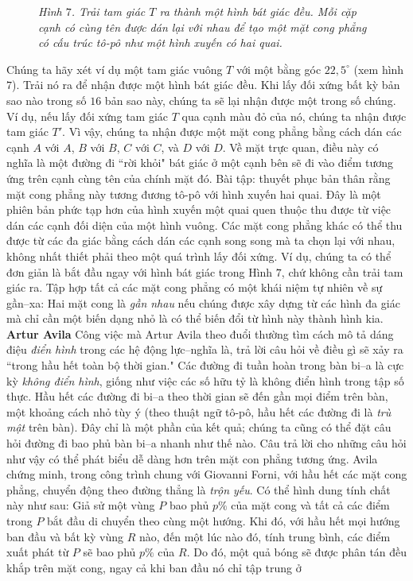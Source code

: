 \begin{multicols}{2}
\begin{figure}[H]
		\caption{\small\textit{\color{duongvaotoanhoc}Hình $7$. Trải tam giác $T$ ra thành một hình bát giác đều. Mỗi cặp cạnh có cùng tên được dán lại với nhau để tạo  một mặt cong phẳng có cấu trúc tô-pô như một hình xuyến có hai quai.}}
		\vspace*{-10pt}
	\end{figure}
	Chúng ta hãy xét ví dụ một tam giác vuông $T$ với một bằng góc $22,5^{\circ}$ (xem hình $7$). Trải nó ra để nhận được một hình bát giác đều. Khi lấy đối xứng bất kỳ bản sao nào trong số $16$ bản sao này, chúng ta sẽ lại nhận được một trong số chúng. Ví dụ, nếu lấy đối xứng tam giác $T$ qua cạnh màu đỏ của nó, chúng ta nhận được tam giác $T'.$ Vì vậy, chúng ta nhận được một mặt cong phẳng bằng cách dán các cạnh $A$ với $A$, $B$ với $B$, $C$ với $C$, và $D$ với $D.$
	\vskip 0.1cm
	Về mặt trực quan, điều này có nghĩa là một đường đi ``rời khỏi" bát giác ở một cạnh bên sẽ đi vào điểm tương ứng trên cạnh cùng tên của chính mặt đó. Bài tập: thuyết phục bản thân rằng mặt cong phẳng này tương đương tô-pô với hình xuyến hai quai. Đây là một phiên bản phức tạp hơn của hình xuyến một quai quen thuộc thu được từ việc dán các cạnh đối diện của một hình vuông.
	\vskip 0.1cm
	Các mặt cong phẳng khác có thể thu được từ các đa giác bằng cách dán các cạnh song song mà ta chọn lại với nhau, không nhất thiết phải theo một quá trình lấy đối xứng. Ví dụ, chúng ta có thể đơn giản là bắt đầu ngay với hình bát giác trong Hình $7$, chứ không cần trải tam giác ra. Tập hợp tất cả các mặt cong phẳng có một khái niệm tự nhiên về sự gần--xa: Hai mặt cong là \emph{gần nhau} nếu chúng được xây dựng từ các hình đa giác mà chỉ cần một biến dạng nhỏ là có thể biến đổi từ hình này thành hình kia.
	\vskip 0.1cm
	{\bf\color{duongvaotoanhoc}Artur Avila}
	\vskip 0.1cm
	Công việc mà Artur Avila theo đuổi thường tìm cách mô tả dáng điệu \emph{điển hình} trong các hệ động lực--nghĩa là, trả lời câu hỏi về điều gì sẽ xảy ra ``trong hầu hết toàn bộ thời gian." Các đường đi tuần hoàn trong bàn bi--a là cực kỳ \emph{không điển hình}, giống như việc các số hữu tỷ là không điển hình trong tập số thực. Hầu hết các đường đi bi--a theo thời gian sẽ đến gần mọi điểm trên bàn, một khoảng cách nhỏ tùy ý (theo thuật ngữ tô-pô, hầu hết các đường đi là \emph{trù mật} trên bàn).
	Đây chỉ là một phần của kết quả; chúng ta cũng có thể đặt câu hỏi đường đi bao phủ bàn bi--a nhanh như thế nào. Câu trả lời cho những câu hỏi như vậy có thể phát biểu dễ dàng hơn trên mặt con phẳng tương ứng.
	\vskip 0.1cm
	Avila chứng minh, trong công trình chung với Giovanni Forni, với hầu hết các mặt cong phẳng, chuyển động theo đường thẳng là \emph{trộn yếu}. Có thể hình dung tính chất này như sau: Giả sử một vùng $P$ bao phủ $p\%$ của mặt cong và tất cả các điểm trong $P$ bắt đầu di chuyển theo cùng một hướng. Khi đó, với hầu hết mọi hướng ban đầu và bất kỳ vùng $R$ nào, đến một lúc nào đó, tính trung bình,  các điểm xuất phát từ $P$ sẽ bao phủ $p\%$ của $R.$ Do đó, một quả bóng sẽ được phân tán đều khắp trên mặt cong, ngay cả khi  ban đầu nó chỉ tập trung ở

\end{multicols}
